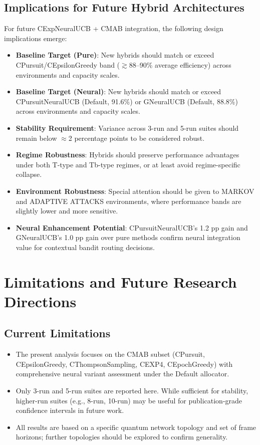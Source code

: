 \documentclass[12pt,a4paper]{article}
\begin{document}
\subsection{Implications for Future Hybrid Architectures}

For future CExpNeuralUCB + CMAB integration, the following design implications emerge:

\begin{itemize}
\item \textbf{Baseline Target (Pure)}: New hybrids should match or exceed CPursuit/CEpsilonGreedy band ($\gtrsim$88–90\% average efficiency) across environments and capacity scales.
\item \textbf{Baseline Target (Neural)}: New hybrids should match or exceed CPursuitNeuralUCB (Default, 91.6\%) or GNeuralUCB (Default, 88.8\%) across environments and capacity scales.
\item \textbf{Stability Requirement}: Variance across 3-run and 5-run suites should remain below $\approx$2 percentage points to be considered robust.
\item \textbf{Regime Robustness}: Hybrids should preserve performance advantages under both T-type and Tb-type regimes, or at least avoid regime-specific collapse.
\item \textbf{Environment Robustness}: Special attention should be given to MARKOV and ADAPTIVE ATTACKS environments, where performance bands are slightly lower and more sensitive.
\item \textbf{Neural Enhancement Potential}: CPursuitNeuralUCB's 1.2 pp gain and GNeuralUCB's 1.0 pp gain over pure methods confirm neural integration value for contextual bandit routing decisions.
\end{itemize}

\section{Limitations and Future Research Directions}

\subsection{Current Limitations}

\begin{itemize}
\item The present analysis focuses on the CMAB subset (CPursuit, CEpsilonGreedy, CThompsonSampling, CEXP4, CEpochGreedy) with comprehensive neural variant assessment under the Default allocator.
\item Only 3-run and 5-run suites are reported here. While sufficient for stability, higher-run suites (e.g., 8-run, 10-run) may be useful for publication-grade confidence intervals in future work.
\item All results are based on a specific quantum network topology and set of frame horizons; further topologies should be explored to confirm generality.
\end{itemize}
\end{document}
